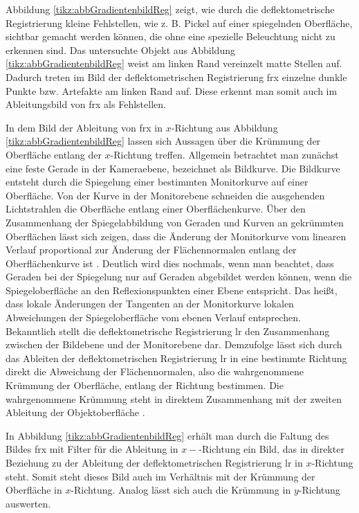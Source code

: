 \noindent
Abbildung \ref{tikz:abbGradientenbildReg} zeigt, wie durch die deflektometrische Registrierung kleine Fehlstellen, wie z. B. Pickel auf einer spiegelnden Oberfläche, sichtbar gemacht werden können, die ohne eine spezielle Beleuchtung nicht zu erkennen sind.
Das untersuchte Objekt aus Abbildung \ref{tikz:abbGradientenbildReg} weist am linken Rand vereinzelt matte Stellen auf.
Dadurch treten im Bild der deflektometrischen Registrierung \acrshort{frx} einzelne dunkle Punkte bzw. Artefakte am linken Rand auf.
Diese erkennt man somit auch im Ableitungsbild von \acrshort{frx} als Fehlstellen.

\p
In dem Bild der Ableitung von \acrshort{frx} in $x$-Richtung aus Abbildung \ref{tikz:abbGradientenbildReg} lassen sich Aussagen über die Krümmung der Oberfläche entlang der $x$-Richtung treffen.
Allgemein betrachtet man zu\-nächst eine feste Gerade in der Kameraebene, bezeichnet als Bildkurve.
Die Bildkurve entsteht durch die Spiegelung einer bestimmten Monitorkurve auf einer Oberfläche.
Von der Kurve in der Monitorebene schneiden die ausgehenden Lichtstrahlen die Oberfläche entlang einer Oberflächenkurve.
Über den Zusammenhang der Spiegelabbildung von Geraden und Kurven an gekrümmten Oberflächen lässt sich zeigen, dass die Änderung der Monitorkurve vom linearen Verlauf proportional zur Änderung der Flächennormalen entlang der Oberflächenkurve ist \cite{kit_werling}.
Deutlich wird dies nochmals, wenn man beachtet, dass Geraden bei der Spiegelung nur auf Geraden abgebildet werden können, wenn die Spiegeloberfläche an den Reflexionspunkten einer Ebene entspricht.
Das heißt, dass lokale Änderungen der Tangenten an der Monitorkurve lokalen Abweichungen der Spiegeloberfläche vom ebenen Verlauf entsprechen.
Bekanntlich stellt die deflektometrische Registrierung \acrshort{lr} den Zusammenhang zwischen der Bildebene und der Monitorebene dar.
Demzufolge lässt sich durch das Ableiten der deflektometrischen Registrierung \acrshort{lr} in eine bestimmte Richtung direkt die Abweichung der Flächennormalen, also die wahrgenommene Krümmung der Oberfläche, entlang der Richtung bestimmen.
Die wahrgenommene Krümmung steht in direktem Zusammenhang mit der zweiten Ableitung der Objektoberfläche \cite{kit_werling}.

\p
In Abbildung \ref{tikz:abbGradientenbildReg} erhält man durch die Faltung des Bildes \acrshort{frx} mit Filter für die Ableitung in $x-$-Richtung ein Bild, das in direkter Beziehung zu der Ableitung der deflektometrischen Registrierung \acrshort{lr} in  $x$-Richtung steht.
Somit steht dieses Bild auch im Verhältnis mit der Krümmung der Oberfläche in $x$-Richtung.
Analog lässt sich auch die Krümmung in $y$-Richtung auswerten.

